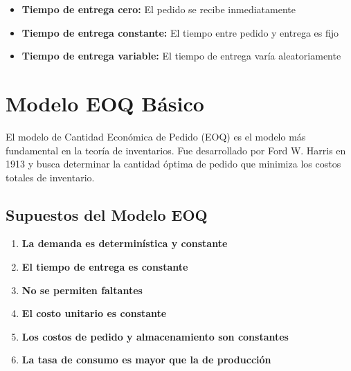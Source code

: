 \documentclass[12pt,a4paper]{book}
\begin{document}
	\begin{tcolorbox}[enhanced,colback=verdeclaro,colframe=verdeprincipal,boxrule=2pt,arc=8pt,
		drop shadow,title={\bfseries\color{white} \faClock\ CLASIFICACIÓN POR TIEMPO DE ENTREGA}]
		
		\begin{itemize}[leftmargin=*,label=\textcolor{naranjaacento}{\faArrowRight}]
			\item \textbf{\color{verdeprincipal}Tiempo de entrega cero:} El pedido se recibe inmediatamente
			\item \textbf{\color{azulprincipal}Tiempo de entrega constante:} El tiempo entre pedido y entrega es fijo
			\item \textbf{\color{rojoacento}Tiempo de entrega variable:} El tiempo de entrega varía aleatoriamente
		\end{itemize}
		
	\end{tcolorbox}
	
	\section{Modelo EOQ Básico}
	
	\begin{tcolorbox}[enhanced,colback=azulclaro,colframe=azulprincipal,boxrule=3pt,arc=12pt,
		drop shadow,title={\Large\bfseries\color{white} \faLightbulb\ FUNDAMENTOS TEÓRICOS}]
		
		El modelo de Cantidad Económica de Pedido (EOQ) es el modelo más fundamental en la teoría de inventarios. Fue desarrollado por Ford W. Harris en 1913 y busca determinar la cantidad óptima de pedido que minimiza los costos totales de inventario.
		
	\end{tcolorbox}
	
	\subsection{Supuestos del Modelo EOQ}
	
	\begin{enumerate}[leftmargin=*,label=\textcolor{azulprincipal}{\faCircle\ \arabic*}]
		\item \textcolor{verdeprincipal}{\textbf{La demanda es determinística y constante}}
		\item \textcolor{azulprincipal}{\textbf{El tiempo de entrega es constante}}
		\item \textcolor{rojoacento}{\textbf{No se permiten faltantes}}
		\item \textcolor{moradoacento}{\textbf{El costo unitario es constante}}
		\item \textcolor{naranjaacento}{\textbf{Los costos de pedido y almacenamiento son constantes}}
		\item \textcolor{grisoScuro}{\textbf{La tasa de consumo es mayor que la de producción}}
	\end{enumerate}
	
\end{document}
